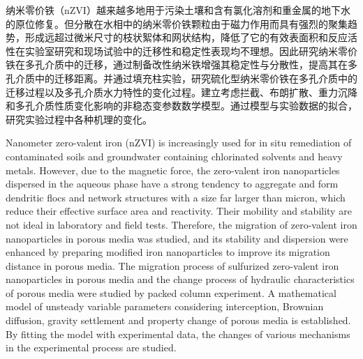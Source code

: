 \begin{cabstract}
	纳米零价铁（nZVI）越来越多地用于污染土壤和含有氯化溶剂和重金属的地下水的原位修复。但分散在水相中的纳米零价铁颗粒由于磁力作用而具有强烈的聚集趋势，形成远超过微米尺寸的枝状絮体和网状结构，降低了它的有效表面积和反应活性在实验室研究和现场试验中的迁移性和稳定性表现均不理想。因此研究纳米零价铁在多孔介质中的迁移，通过制备改性纳米铁增强其稳定性与分散性，提高其在多孔介质中的迁移距离。并通过填充柱实验，研究硫化型纳米零价铁在多孔介质中的迁移过程以及多孔介质水力特性的变化过程。建立考虑拦截、布朗扩散、重力沉降和多孔介质性质变化影响的非稳态变参数数学模型。通过模型与实验数据的拟合，研究实验过程中各种机理的变化。
\end{cabstract}

\begin{eabstract}
	Nanometer zero-valent iron (nZVI) is increasingly used for in situ remediation of contaminated soils and groundwater containing chlorinated solvents and heavy metals.  However, due to the magnetic force, the zero-valent iron nanoparticles dispersed in the aqueous phase have a strong tendency to aggregate and form dendritic flocs and network structures with a size far larger than micron, which reduce their effective surface area and reactivity. Their mobility and stability are not ideal in laboratory and field tests.  Therefore, the migration of zero-valent iron nanoparticles in porous media was studied, and its stability and dispersion were enhanced by preparing modified iron nanoparticles to improve its migration distance in porous media.  The migration process of sulfurized zero-valent iron nanoparticles in porous media and the change process of hydraulic characteristics of porous media were studied by packed column experiment.  A mathematical model of unsteady variable parameters considering interception, Brownian diffusion, gravity settlement and property change of porous media is established.  By fitting the model with experimental data, the changes of various mechanisms in the experimental process are studied.  
\end{eabstract}